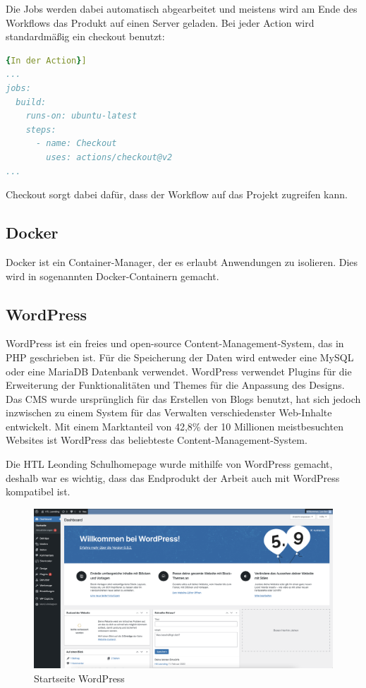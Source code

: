 Die Jobs werden dabei automatisch abgearbeitet und meistens wird am Ende des Workflows das Produkt auf einen Server geladen.
Bei jeder Action wird standardmäßig ein checkout benutzt:

\begin{lstlisting}[language=yaml,label={lst:checkout},caption={In der Action}]{In der Action}]
...
jobs:
  build:
    runs-on: ubuntu-latest
    steps:
      - name: Checkout
        uses: actions/checkout@v2
...
\end{lstlisting}

Checkout sorgt dabei dafür, dass der Workflow auf das Projekt zugreifen kann.

\subsection{Docker}
Docker ist ein Container-Manager, der es erlaubt Anwendungen zu isolieren.
Dies wird in sogenannten Docker-Containern gemacht.

\subsection{WordPress}
WordPress ist ein freies und open-source Content-Management-System, das in PHP geschrieben ist.
Für die Speicherung der Daten wird entweder eine MySQL oder eine MariaDB Datenbank verwendet.
WordPress verwendet Plugins für die Erweiterung der Funktionalitäten und Themes für die Anpassung des Designs.
Das CMS wurde ursprünglich für das Erstellen von Blogs benutzt, hat sich jedoch inzwischen zu einem System für das Verwalten verschiedenster Web-Inhalte entwickelt.
Mit einem Marktanteil von 42,8\% der 10 Millionen meistbesuchten Websites ist WordPress das beliebteste Content-Management-System.

Die HTL Leonding Schulhomepage wurde mithilfe von WordPress gemacht, deshalb war es wichtig, dass das Endprodukt der Arbeit auch mit WordPress kompatibel ist.


\begin{figure}[hbt!]
    \centering
    \includegraphics[scale=0.2]{pics/wordpresshome}
    \caption{Startseite WordPress}
    \label{fig:impl:wordpresshome}
\end{figure}


